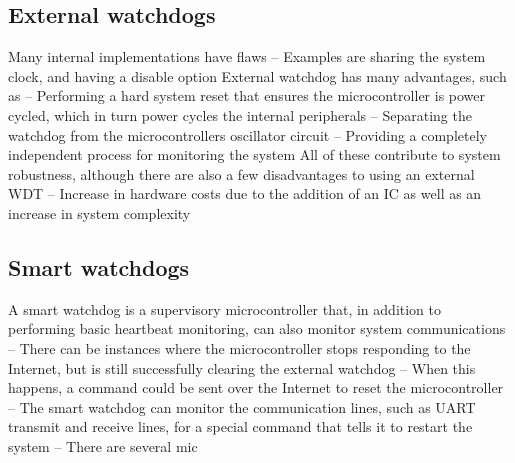 \subsection{External watchdogs}
Many internal implementations have flaws
– Examples are sharing the system clock, and having a disable option
 External watchdog has many advantages, such as
– Performing a hard system reset that ensures the microcontroller is
power cycled, which in turn power cycles the internal peripherals
– Separating the watchdog from the microcontrollers oscillator circuit
– Providing a completely independent process for monitoring the
system
 All of these contribute to system robustness, although there
are also a few disadvantages to using an external WDT
– Increase in hardware costs due to the addition of an IC as well as
an increase in system complexity


\subsection{Smart watchdogs}
A smart watchdog is a supervisory microcontroller that, in
addition to performing basic heartbeat monitoring, can also
monitor system communications
– There can be instances where the microcontroller stops responding
to the Internet, but is still successfully clearing the external
watchdog
– When this happens, a command could be sent over the Internet to
reset the microcontroller
– The smart watchdog can monitor the communication lines, such as
UART transmit and receive lines, for a special command that tells it
to restart the system
– There are several mic


